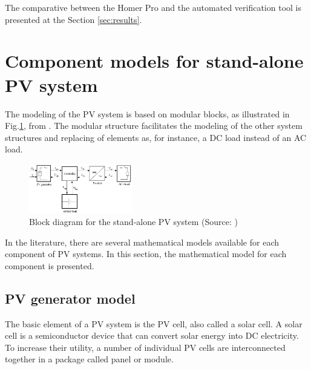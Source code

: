\documentclass[journal]{IEEEtran}
\begin{document}
The comparative between the Homer Pro and the automated verification tool is presented at the Section \ref{sec:results}.

\section{Component models for stand-alone PV system }
The modeling of the PV system is based on modular blocks, as illustrated in Fig.\ref{fig:blockdiagram}, from \cite{Hansen}. The modular structure facilitates the modeling of the other system structures and replacing of elements as, for instance, a DC load instead of an AC load. 

\begin{figure}[h]
\includegraphics[width=0.4\textwidth]{blockdiagramPVS}
\centering
\caption{Block diagram for the stand-alone PV system (Source: \cite{Hansen})}
\label{fig:blockdiagram}
\end{figure}

In the literature, there are several mathematical models available for each component of PV systems. In this section, the mathematical model for each component is presented. 

\subsection{PV generator model}
%
The basic element of a PV system is the PV cell, also called a solar cell. A solar cell is a semiconductor device that can convert solar energy into DC electricity. 
To increase their utility, a number of individual PV cells are interconnected together in a %
package called panel or module. 
\end{document}
